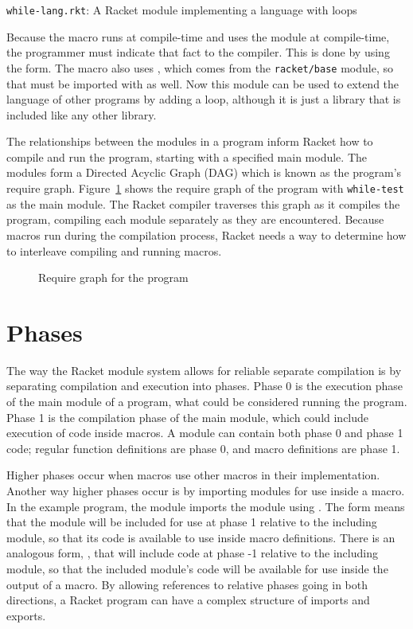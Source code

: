 \begin{listing}[tb]
  \inputminted{racket}{listings/while-lang.rkt}
  \caption{\texttt{while-lang.rkt}: A Racket module implementing a language with  loops}
  \label{lst:while-lang.rkt}
\end{listing}

Because the macro runs at compile-time and uses the  module at compile-time, the programmer must indicate that fact to the compiler.
This is done by using the  form. 
The macro also uses , which comes from the \texttt{racket/base} module, so that must be imported with  as well.
Now this module can be used to extend the language of other programs by adding a  loop, although it is just a library that is included like any other library.

The relationships between the modules in a program inform Racket how to compile and run the program, starting with a specified main module.
The modules form a Directed Acyclic Graph (DAG) which is known as the program's require graph.
Figure~\ref{fig:modules.tex} shows the require graph of the program with \texttt{while-test} as the main module. 
The Racket compiler traverses this graph as it compiles the program, compiling each module separately as they are encountered.
Because macros run during the compilation process, Racket needs a way to determine how to interleave compiling and running macros. 
\begin{figure}
  
  \caption{Require graph for the  program}
  \label{fig:modules.tex}
\end{figure}

\section{Phases}

The way the Racket module system allows for reliable separate compilation is by separating compilation and execution into phases.
Phase 0 is the execution phase of the main module of a program, what could be considered running the program.
Phase 1 is the compilation phase of the main module, which could include execution of code inside macros. 
A module can contain both phase 0 and phase 1 code; regular function definitions are phase 0, and macro definitions are phase 1.

Higher phases occur when macros use other macros in their implementation.
Another way higher phases occur is by importing modules for use inside a macro.
In the example program, the  module imports the  module using .
The  form means that the module will be included for use at phase 1 relative to the including module, so that its code is available to use inside macro definitions.
There is an analogous form, , that will include code at phase -1 relative to the including module, so that the included module's code will be available for use inside the output of a macro. 
By allowing references to relative phases going in both directions, a Racket program can have a complex structure of imports and exports.

